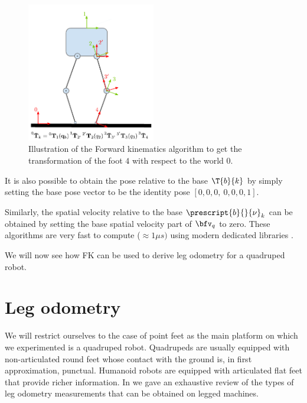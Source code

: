 \begin{figure}
    \centering
    \includegraphics[width=0.5\textwidth]{figures/kinematic_tree_FK.pdf}
    \caption{Illustration of the Forward kinematics algorithm to get the transformation of the foot $4$ with respect to the world $0$.}
    \label{fig:forward_kinematics}
\end{figure}


It is also possible to obtain the pose relative to the base $\T{b}{k}$ by simply setting the base pose vector to be the identity pose $[0,0,0,~0,0,0,1]$.



Similarly, the spatial velocity relative to the base $\prescript{b}{}{\mathbf{\nu}}_k$ can be obtained by setting the base spatial velocity part of $\bfv_q$ to zero.
These algorithms are very fast to compute ($\approx 1\mu s)$ using modern dedicated libraries \cite{carpentier2019pinocchio}.

We will now see how FK can be used to derive leg odometry for a quadruped robot.

\section{Leg odometry}
We will restrict ourselves to the case of point feet as the main platform on which we experimented is a quadruped robot.
Quadrupeds are usually equipped with non-articulated round feet whose contact with the ground is, in first approximation, punctual.
Humanoid robots are equipped with articulated flat feet that provide richer information. In  we gave an exhaustive review of the types of leg 
odometry measurements that can be obtained on legged machines.

